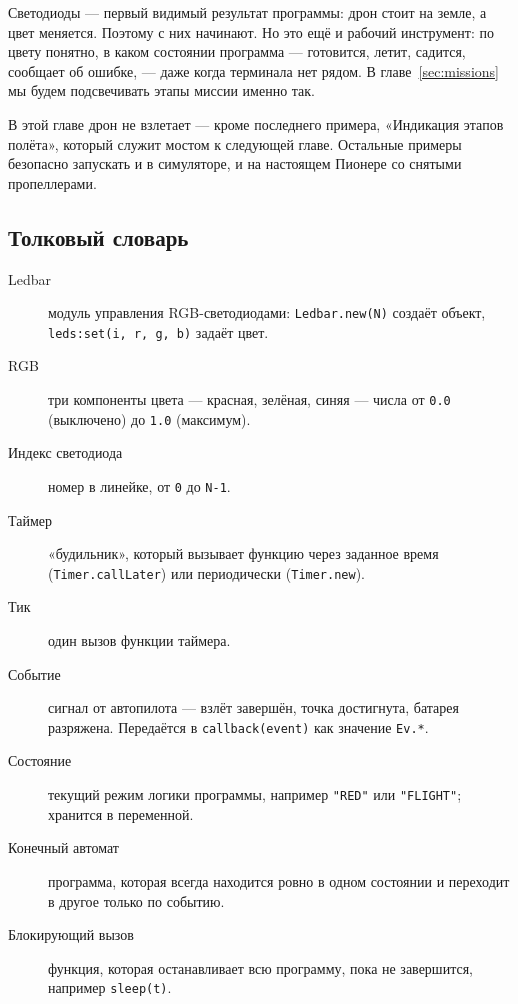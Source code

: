 Светодиоды --- первый видимый результат программы: дрон стоит на земле, а цвет меняется. Поэтому с них начинают. Но это ещё и рабочий инструмент: по цвету понятно, в каком состоянии программа --- готовится, летит, садится, сообщает об ошибке, --- даже когда терминала нет рядом. В главе~\ref{sec:missions} мы будем подсвечивать этапы миссии именно так.

В этой главе дрон не взлетает --- кроме последнего примера, «Индикация этапов полёта», который служит мостом к следующей главе. Остальные примеры безопасно запускать и в симуляторе, и на настоящем Пионере со снятыми пропеллерами.

\subsection{Толковый словарь}
\begin{description}
  \item[\hypertarget{term:ledbar}{Ledbar}] модуль управления RGB-светодиодами: \verb|Ledbar.new(N)| создаёт объект, \verb|leds:set(i, r, g, b)| задаёт цвет.
  \item[\hypertarget{term:rgb}{RGB}] три компоненты цвета --- красная, зелёная, синяя --- числа от \verb|0.0| (выключено) до \verb|1.0| (максимум).
  \item[\hypertarget{term:index}{Индекс светодиода}] номер в линейке, от \verb|0| до \verb|N-1|.
  \item[\hypertarget{term:timer}{Таймер}] «будильник», который вызывает функцию через заданное время (\verb|Timer.callLater|) или периодически (\verb|Timer.new|).
  \item[\hypertarget{term:tick}{Тик}] один вызов функции таймера.
  \item[\hypertarget{term:event}{Событие}] сигнал от автопилота --- взлёт завершён, точка достигнута, батарея разряжена. Передаётся в \verb|callback(event)| как значение \verb|Ev.*|.
  \item[\hypertarget{term:state}{Состояние}] текущий режим логики программы, например \verb|"RED"| или \verb|"FLIGHT"|; хранится в переменной.
  \item[\hypertarget{term:automaton}{Конечный автомат}] программа, которая всегда находится ровно в одном состоянии и переходит в другое только по событию.
  \item[\hypertarget{term:blocking}{Блокирующий вызов}] функция, которая останавливает всю программу, пока не завершится, например \verb|sleep(t)|.
\end{description}
